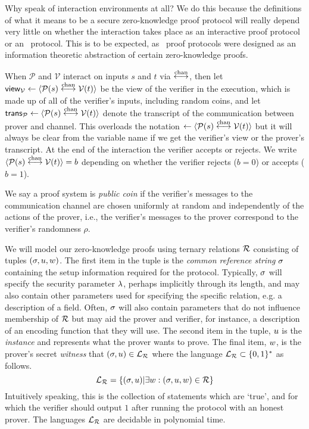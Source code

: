 Why speak of interaction environments at all? We do this because the definitions of what it means to be a secure zero-knowledge proof protocol will really depend very little on whether the interaction takes place as an interactive proof protocol or an \ILC\ protocol. This is to be expected, as \ILC\ proof protocols were designed as an information theoretic abstraction of certain zero-knowledge proofs.

When $\mathcal{P}$ and $\mathcal{V}$ interact on inputs $s$ and $t$ via $\overset{\textnormal{chan}}{\longleftrightarrow}$, then let $\mathsf{view}_{\mathcal{V}} \leftarrow \langle \mathcal{P}(s) \overset{\textnormal{chan}}{\longleftrightarrow} \mathcal{V}(t)\rangle$ be the view of the verifier in the execution, which is made up of all of the verifier's inputs, including random coins, and let $\mathsf{trans}_{\mathcal{P}} \leftarrow  \langle \mathcal{P}(s) \overset{\textnormal{chan}}{\longleftrightarrow} \mathcal{V}(t)\rangle$ denote the transcript of the communication between prover and channel. This overloads the notation $\leftarrow  \langle \mathcal{P}(s) \overset{\textnormal{chan}}{\longleftrightarrow} \mathcal{V}(t)\rangle$ but it will always be clear from the variable name if we get the verifier's view or the prover's transcript. At the end of the interaction the verifier accepts or rejects. We write $\langle \mathcal{P}(s)\overset{\textnormal{chan}}{\longleftrightarrow} \mathcal{V}(t)\rangle =b$ depending on whether the verifier rejects ($b=0$) or accepts ($b=1$).

We say a proof system is \emph{public coin} if the verifier's messages to the communication channel are chosen uniformly at random and independently of the actions of the prover, i.e., the verifier's messages to the prover correspond to the verifier's randomness $\rho$.

We will model our zero-knowledge proofs using ternary relations $\mathcal{R}$ consisting of tuples $(\mathsf{\sigma}, u,w)$. The first item in the tuple is the \emph{common reference string} $\mathsf{\sigma}$ containing the setup information required for the protocol. Typically, $\mathsf{\sigma}$ will specify the security parameter $\lambda$, perhaps implicitly through its length, and may also contain other parameters used for specifying the specific relation, e.g. a description of a field. Often, $\mathsf{\sigma}$ will also contain parameters that do not influence membership of $\mathcal{R}$ but may aid the prover and verifier, for instance, a description of an encoding function that they will use. The second item in the tuple, $u$ is the \emph{instance} and represents what the prover wants to prove. The final item, $w$, is the prover's secret \emph{witness} that $(\mathsf{\sigma},u)\in\mathcal{L}_{\mathcal{R}}$ where the language $\mathcal{L}_{\mathcal{R}} \subset \{0,1\}^*$ as follows.
\[ \mathcal{L}_{\mathcal{R}}=\{(\mathsf{\sigma},u)|\exists w: (\mathsf{\sigma},u,w)\in \mathcal{R}\} \]
Intuitively speaking, this is the collection of statements which are `true', and for which the verifier should output $1$ after running the protocol with an honest prover. The languages $\mathcal{L}_{\mathcal{R}}$ are decidable in polynomial time.

